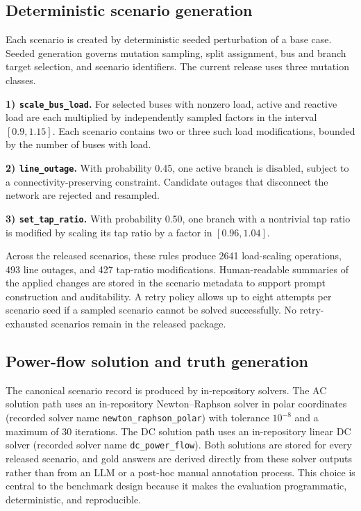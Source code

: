 \subsection*{Deterministic scenario generation}

Each scenario is created by deterministic seeded perturbation of a base case. Seeded generation governs mutation sampling, split assignment, bus and branch target selection, and scenario identifiers. The current release uses three mutation classes.

\textbf{1) \texttt{scale\_bus\_load}.} For selected buses with nonzero load, active and reactive load are each multiplied by independently sampled factors in the interval $[0.9, 1.15]$. Each scenario contains two or three such load modifications, bounded by the number of buses with load.

\textbf{2) \texttt{line\_outage}.} With probability 0.45, one active branch is disabled, subject to a connectivity-preserving constraint. Candidate outages that disconnect the network are rejected and resampled.

\textbf{3) \texttt{set\_tap\_ratio}.} With probability 0.50, one branch with a nontrivial tap ratio is modified by scaling its tap ratio by a factor in $[0.96, 1.04]$.

Across the released scenarios, these rules produce 2641 load-scaling operations, 493 line outages, and 427 tap-ratio modifications. Human-readable summaries of the applied changes are stored in the scenario metadata to support prompt construction and auditability. A retry policy allows up to eight attempts per scenario seed if a sampled scenario cannot be solved successfully. No retry-exhausted scenarios remain in the released package.

\subsection*{Power-flow solution and truth generation}

The canonical scenario record is produced by in-repository solvers. The AC solution path uses an in-repository Newton--Raphson solver in polar coordinates (recorded solver name \texttt{newton\_raphson\_polar}) with tolerance $10^{-8}$ and a maximum of 30 iterations. The DC solution path uses an in-repository linear DC solver (recorded solver name \texttt{dc\_power\_flow}). Both solutions are stored for every released scenario, and gold answers are derived directly from these solver outputs rather than from an LLM or a post-hoc manual annotation process. This choice is central to the benchmark design because it makes the evaluation programmatic, deterministic, and reproducible.

